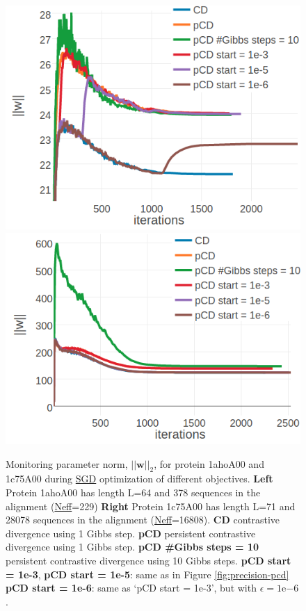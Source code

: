\documentclass[11pt,a4paper,twoside]{book}
\newcommand{\eq}{\!=\!}
\newcommand{\w}{\mathbf{w}}
\theoremstyle{definition}
\theoremstyle{definition}
\theoremstyle{remark}
\begin{document}
\begin{figure}

{\centering \includegraphics[width=0.48\linewidth]{img/full_likelihood/pcd/1ahoA00_parameter_norm} \includegraphics[width=0.48\linewidth]{img/full_likelihood/pcd/1c75A00_parameter_norm} 

}

\caption{Monitoring parameter norm,
\(||\w||_2\), for protein 1ahoA00 and 1c75A00 during
\protect\hyperlink{abbrev}{SGD} optimization of different objectives.
\textbf{Left} Protein 1ahoA00 has length L=64 and 378 sequences in the
alignment (\protect\hyperlink{abbrev}{Neff}=229) \textbf{Right} Protein
1c75A00 has length L=71 and 28078 sequences in the alignment
(\protect\hyperlink{abbrev}{Neff}=16808). \textbf{CD} contrastive
divergence using 1 Gibbs step. \textbf{pCD} persistent contrastive
divergence using 1 Gibbs step. \textbf{pCD \#Gibbs steps = 10}
persistent contrastive divergence using 10 Gibbs steps. \textbf{pCD
start = 1e-3}, \textbf{pCD start = 1e-5}: same as in Figure
\ref{fig:precision-pcd} \textbf{pCD start = 1e-6}: same as `pCD start =
1e-3', but with \(\epsilon \eq \mathrm{1e}{-6}\).}\label{fig:pcd-single-proteins}
\end{figure}
\end{document}
